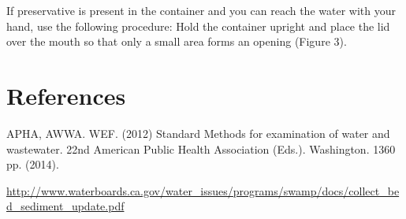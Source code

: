 \documentclass[12pt]{../SOP4_alpha}\usepackage[]{graphicx}\usepackage[]{xcolor}
\begin{document}
\NP If preservative is present in the container and you can reach the water with your hand, use the following procedure:  Hold the container upright and place the lid over the mouth so that only a small area forms an opening (Figure 3).

\NP

\section{References}

\NP APHA, AWWA. WEF. (2012) Standard Methods for examination of water and wastewater. 22nd American Public Health Association (Eds.). Washington. 1360 pp. (2014).

\NP \url{http://www.waterboards.ca.gov/water_issues/programs/swamp/docs/collect_bed_sediment_update.pdf}
\end{document}

